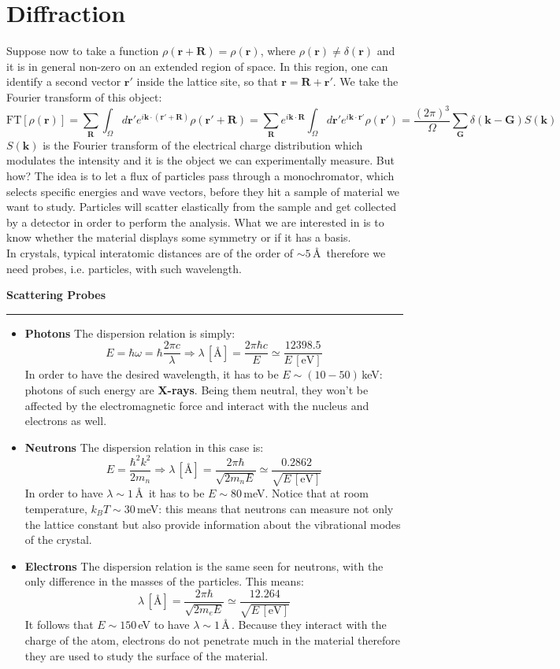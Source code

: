 \documentclass[10.75pt,a4paper,openright,bottom=2cm]{article}
\renewcommand{\Vec}[1]{\boldsymbol{#1}}
\begin{document}
\section{Diffraction}
Suppose now to take a function $\rho(\Vec{r}+\Vec{R})=\rho(\Vec{r})$, where $\rho(\Vec{r})\neq\delta(\Vec{r})$ and it is in general non-zero on an extended region of space. In this region, one can identify a second vector $\Vec{r'}$ inside the lattice site, so that $\Vec{r}=\Vec{R}+\Vec{r'}$. We take the Fourier transform of this object:
\[
\text{FT}[\rho(\Vec{r})]=\sum_{\Vec{R}}\int_\Omega d\Vec{r'}e^{i\Vec{k}\cdot(\Vec{r'}+\Vec{R})}\rho(\Vec{r'}+\Vec{R})=\sum_{\Vec{R}}e^{i\Vec{k}\cdot\Vec{R}}\int_\Omega d\Vec{r'}e^{i\Vec{k}\cdot\Vec{r'}}\rho(\Vec{r'})=\frac{(2\pi)^3}{\Omega}\sum_{\Vec{G}}\delta(\Vec{k}-\Vec{G})S(\Vec{k})
\]
$S(\Vec{k})$ is the Fourier transform of the electrical charge distribution which modulates the intensity and it is the object we can experimentally measure. But how? The idea is to let a flux of particles pass through a monochromator, which selects specific energies and wave vectors, before they hit a sample of material we want to study. Particles will scatter elastically from the sample and get collected by a detector in order to perform the analysis. What we are interested in is to know whether the material displays some symmetry or if it has a basis.\\
In crystals, typical interatomic distances are of the order of $\sim5$\,\AA\, therefore we need probes, i.e. particles, with such wavelength. 
\begin{mybox}
\textbf{Scattering Probes}
\hrule
\begin{itemize}
    \item \textbf{Photons} The dispersion relation is simply:
    \[
    E=\hbar\omega=\hbar\frac{2\pi c}{\lambda}\Rightarrow\lambda\,[\text{\AA}]=\frac{2\pi\hbar c}{E}\simeq\frac{12398.5}{E\,[\text{eV}]}
    \]
    In order to have the desired wavelength, it has to be $E\sim(10-50)\,$keV: photons of such energy are \textbf{X-rays}. Being them neutral, they won't be affected by the electromagnetic force and interact with the nucleus and electrons as well.
    \item \textbf{Neutrons} The dispersion relation in this case is:
    \[
    E=\frac{\hbar^2k^2}{2m_n}\Rightarrow\lambda\,[\text{\AA}]=\frac{2\pi\hbar}{\sqrt{2m_nE}}\simeq\frac{0.2862}{\sqrt{E\,[\text{eV}]}}
    \]
    In order to have $\lambda\sim1$\,\AA\, it has to be $E\sim80$\,meV. Notice that at room temperature, $k_BT\sim30$\,meV: this means that neutrons can measure not only the lattice constant but also provide information about the vibrational modes of the crystal.
    \item \textbf{Electrons} The dispersion relation is the same seen for neutrons, with the only difference in the masses of the particles. This means:
    \[
    \lambda\,[\text{\AA}]=\frac{2\pi\hbar}{\sqrt{2m_eE}}\simeq\frac{12.264}{\sqrt{E\,[\text{eV}]}}
    \]
    It follows that $E\sim150$\,eV to have $\lambda\sim1$\,\AA\,. Because they interact with the charge of the atom, electrons do not penetrate much in the material therefore they are used to study the surface of the material.
\end{itemize}
\end{mybox}\noindent
\end{document}
